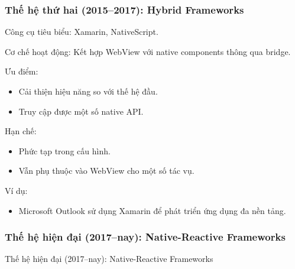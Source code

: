 \begin{flushleft}
      \subsubsection{Thế hệ thứ hai (2015–2017): Hybrid Frameworks}
        \begin{flushleft}
          \hspace*{0.8cm}Công cụ tiêu biểu: Xamarin, NativeScript.
        \end{flushleft}

        \begin{flushleft}
          \hspace*{0.8cm}Cơ chế hoạt động: Kết hợp WebView với native components thông qua bridge.
        \end{flushleft}

        \begin{flushleft}
          \hspace*{0.8cm}Ưu điểm:
          \setlength{\leftmargini}{1.5cm}
          \begin{itemize}
              \item Cải thiện hiệu năng so với thế hệ đầu.
              \item Truy cập được một số native API.
          \end{itemize}
        \end{flushleft}

        \begin{flushleft}
          \hspace*{0.8cm}Hạn chế:
          \setlength{\leftmargini}{1.5cm}
          \begin{itemize}
              \item Phức tạp trong cấu hình.
              \item Vẫn phụ thuộc vào WebView cho một số tác vụ.
          \end{itemize}
        \end{flushleft}

        \begin{flushleft}
          \hspace*{0.8cm}Ví dụ:
          \setlength{\leftmargini}{1.5cm}
          \begin{itemize}
              \item Microsoft Outlook sử dụng Xamarin để phát triển ứng dụng đa nền tảng.
          \end{itemize}
        \end{flushleft}

      \subsubsection{Thế hệ hiện đại (2017–nay): Native-Reactive Frameworks}
        \begin{flushleft}
          \hspace*{0.8cm}Thế hệ hiện đại (2017–nay): Native-Reactive Frameworks
        \end{flushleft}


\end{flushleft}
